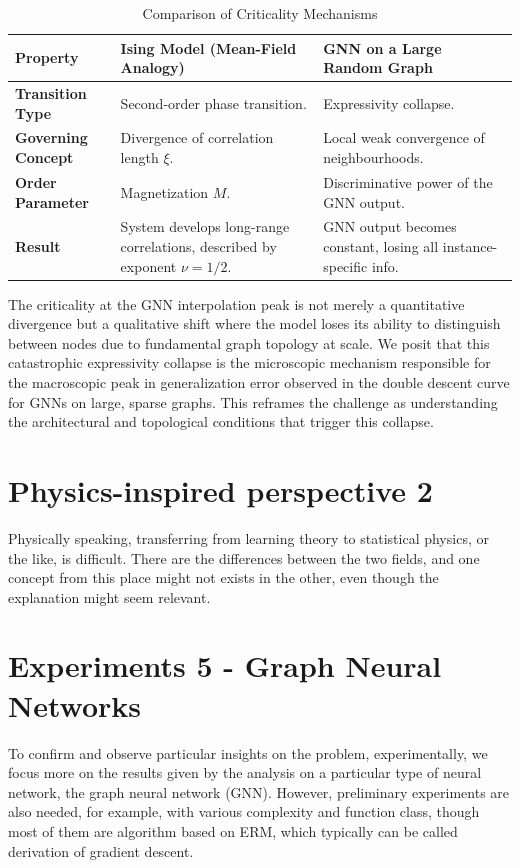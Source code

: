 \documentclass{article}
\begin{document}
\begin{table}[h!]
\centering
\small
\caption{Comparison of Criticality Mechanisms}
\begin{tabular}{|p{3cm}|p{4cm}|p{4cm}|}
\hline
\textbf{Property} & \textbf{Ising Model (Mean-Field Analogy)} & \textbf{GNN on a Large Random Graph} \\
\hline
\textbf{Transition Type} & Second-order phase transition. & Expressivity collapse. \\
\hline
\textbf{Governing Concept} & Divergence of correlation length $\xi$. & Local weak convergence of neighbourhoods. \\
\hline
\textbf{Order Parameter} & Magnetization $M$. & Discriminative power of the GNN output. \\
\hline
\textbf{Result} & System develops long-range correlations, described by exponent $\nu=1/2$. & GNN output becomes constant, losing all instance-specific info. \\
\hline
\end{tabular}
\end{table}
The criticality at the GNN interpolation peak is not merely a quantitative divergence but a qualitative shift where the model loses its ability to distinguish between nodes due to fundamental graph topology at scale. We posit that this catastrophic expressivity collapse is the microscopic mechanism responsible for the macroscopic peak in generalization error observed in the double descent curve for GNNs on large, sparse graphs. This reframes the challenge as understanding the architectural and topological conditions that trigger this collapse.

\section{Physics-inspired perspective 2}

Physically speaking, transferring from learning theory to statistical physics, or the like, is difficult. There are the differences between the two fields, and one concept from this place might not exists in the other, even though the explanation might seem relevant. 


\clearpage

\section{Experiments 5 - Graph Neural Networks}
To confirm and observe particular insights on the problem, experimentally, we focus more on the results given by the analysis on a particular type of neural network, the graph neural network (GNN). However, preliminary experiments are also needed, for example, with various complexity and function class, though most of them are algorithm based on ERM, which typically can be called derivation of gradient descent. 
\end{document}
